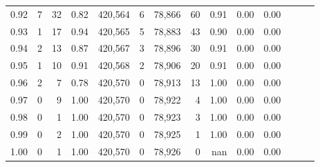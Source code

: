 \begin{tabular}{rrrrrrrrrrrrrr}
0.92 &      7 &     32 &  0.82 &  420,564 &        6 &  78,866 &      60 &  0.91 &  0.00 &      0.00 \\
0.93 &      1 &     17 &  0.94 &  420,565 &        5 &  78,883 &      43 &  0.90 &  0.00 &      0.00 \\
0.94 &      2 &     13 &  0.87 &  420,567 &        3 &  78,896 &      30 &  0.91 &  0.00 &      0.00 \\
0.95 &      1 &     10 &  0.91 &  420,568 &        2 &  78,906 &      20 &  0.91 &  0.00 &      0.00 \\
0.96 &      2 &      7 &  0.78 &  420,570 &        0 &  78,913 &      13 &  1.00 &  0.00 &      0.00 \\
0.97 &      0 &      9 &  1.00 &  420,570 &        0 &  78,922 &       4 &  1.00 &  0.00 &      0.00 \\
0.98 &      0 &      1 &  1.00 &  420,570 &        0 &  78,923 &       3 &  1.00 &  0.00 &      0.00 \\
0.99 &      0 &      2 &  1.00 &  420,570 &        0 &  78,925 &       1 &  1.00 &  0.00 &      0.00 \\
1.00 &      0 &      1 &  1.00 &  420,570 &        0 &  78,926 &       0 &   nan &  0.00 &      0.00 \\
\bottomrule
\end{tabular}
